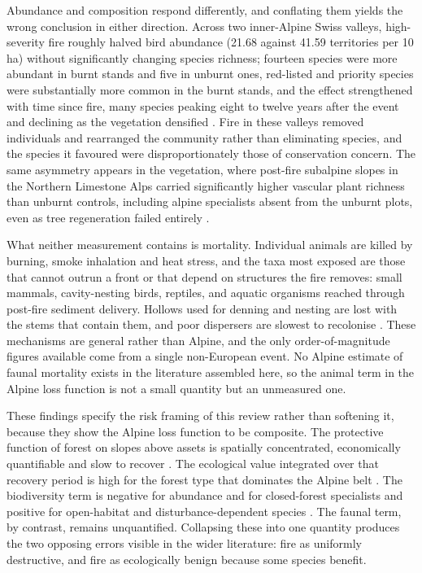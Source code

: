 \documentclass[11pt,a4paper]{article}
\begin{document}
Abundance and composition respond differently, and conflating them yields the wrong conclusion in either direction. Across two inner-Alpine Swiss valleys, high-severity fire roughly halved bird abundance (21.68 against 41.59 territories per 10\,ha) without significantly changing species richness; fourteen species were more abundant in burnt stands and five in unburnt ones, red-listed and priority species were substantially more common in the burnt stands, and the effect strengthened with time since fire, many species peaking eight to twelve years after the event and declining as the vegetation densified \citep{rey_effects_2019}. Fire in these valleys removed individuals and rearranged the community rather than eliminating species, and the species it favoured were disproportionately those of conservation concern. The same asymmetry appears in the vegetation, where post-fire subalpine slopes in the Northern Limestone Alps carried significantly higher vascular plant richness than unburnt controls, including alpine specialists absent from the unburnt plots, even as tree regeneration failed entirely \citep{degiuli_arrested_2024}.

What neither measurement contains is mortality. Individual animals are killed by burning, smoke inhalation and heat stress, and the taxa most exposed are those that cannot outrun a front or that depend on structures the fire removes: small mammals, cavity-nesting birds, reptiles, and aquatic organisms reached through post-fire sediment delivery. Hollows used for denning and nesting are lost with the stems that contain them, and poor dispersers are slowest to recolonise \citep{demiguel_fires_2021}. These mechanisms are general rather than Alpine, and the only order-of-magnitude figures available come from a single non-European event. No Alpine estimate of faunal mortality exists in the literature assembled here, so the animal term in the Alpine loss function is not a small quantity but an unmeasured one.

These findings specify the risk framing of this review rather than softening it, because they show the Alpine loss function to be composite. The protective function of forest on slopes above assets is spatially concentrated, economically quantifiable \citep{moos_climate_2021} and slow to recover \citep{stritih_alternative_2023, degiuli_arrested_2024}. The ecological value integrated over that recovery period is high for the forest type that dominates the Alpine belt \citep{arrogantefunes_mapping_2024}. The biodiversity term is negative for abundance and for closed-forest specialists and positive for open-habitat and disturbance-dependent species \citep{rey_effects_2019, degiuli_arrested_2024}. The faunal term, by contrast, remains unquantified. Collapsing these into one quantity produces the two opposing errors visible in the wider literature: fire as uniformly destructive, and fire as ecologically benign because some species benefit.
\end{document}
